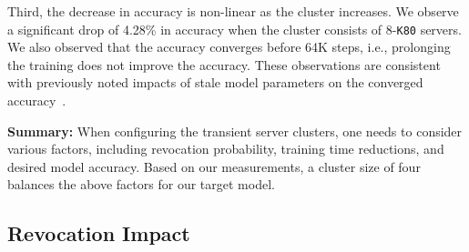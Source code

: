 Third, the decrease in accuracy is non-linear as the cluster increases. We
observe a significant drop of 4.28\% in accuracy when the cluster consists of 8-\texttt{K80} servers.  
We also observed that the accuracy converges before 64K steps, i.e.,
prolonging the training does not improve the accuracy.  These observations are
consistent with previously noted impacts of stale model parameters on the
converged accuracy~\cite{stale1,stale2,stale3,stale4}.  




\textbf{Summary:} When configuring the transient server clusters, one needs to
consider various factors, including revocation probability, training time
reductions, and desired model accuracy.  Based on our measurements, a cluster
size of four balances the above factors for our target model. 




\subsection{Revocation Impact}
\label{subsec:revocation}


